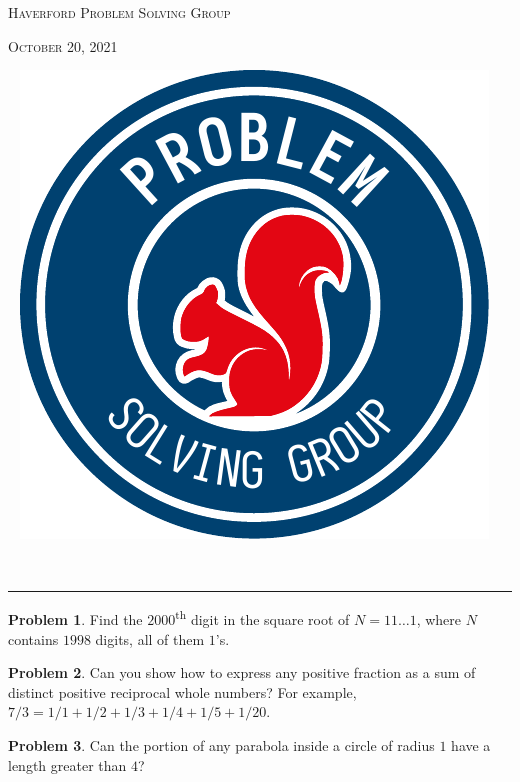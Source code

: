 \documentclass{scrartcl}
\theoremstyle{definition}
\newtheorem{prob}{Problem}
\begin{document}
	\begin{minipage}{.6\textwidth}{}
		\textsc{Haverford Problem Solving Group}

		\textsc{October 20, 2021}
	\end{minipage}
	\begin{minipage}{.4\textwidth}{}
		\ \hfill
		\includegraphics[height = .9in]{psg_logo}
	\end{minipage}\\[1em]

	\hrule

	\setcounter{prob}{2}
	\begin{prob}
		Find the $2000$\textsuperscript{th} digit in the square root of $N = 11\dots1$, where $N$ contains $1998$ digits, all of them $1$'s.
	\end{prob}

	\setcounter{prob}{4}
	\begin{prob}
		Can you show how to express any positive fraction as a sum of distinct positive reciprocal whole numbers? For example, $7/3 = 1/1 + 1/2 + 1/3 + 1/4 + 1/5 + 1/20$.
	\end{prob}

	\begin{prob}
		Can the portion of any parabola inside a circle of radius \(1\) have a length greater than \(4\)?
	\end{prob}

	\setcounter{prob}{9}
\end{document}
